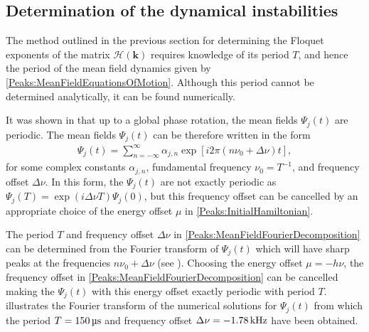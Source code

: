 \subsection{Determination of the dynamical instabilities}
\label{Peaks:ExperimentEigenvalues}

The method outlined in the previous section for determining the Floquet exponents of the matrix $\mathcal{H}(\bm{k})$ requires knowledge of its period $T$, and hence the period of the mean field dynamics given by \eqref{Peaks:MeanFieldEquationsOfMotion}. Although this period cannot be determined analytically, it can be found numerically.

It was shown in  that up to a global phase rotation, the mean fields $\Psi_j(t)$ are periodic. The mean fields $\Psi_j(t)$ can be therefore written in the form
\begin{align}
    \label{Peaks:MeanFieldFourierDecomposition}
    \Psi_j(t) = \sum_{n=-\infty}^\infty \alpha_{j,n} \exp\left[i 2\pi \left( n \nu_0 + \Delta\nu\right)t \right],
\end{align}
for some complex constants $\alpha_{j, n}$, fundamental frequency $\nu_0 = T^{-1}$, and frequency offset $\Delta \nu$. In this form, the $\Psi_j(t)$ are not exactly periodic as $\Psi_j(T) = \exp(i\Delta \nu T)\Psi_j(0)$, but this frequency offset can be cancelled by an appropriate choice of the energy offset $\mu$ in \eqref{Peaks:InitialHamiltonian}.

The period $T$ and frequency offset $\Delta\nu$ in \eqref{Peaks:MeanFieldFourierDecomposition} can be determined from the Fourier transform of $\Psi_j(t)$ which will have sharp peaks at the frequencies $n \nu_0 + \Delta \nu$ (see ). Choosing the energy offset $\mu=-h \nu$, the frequency offset in \eqref{Peaks:MeanFieldFourierDecomposition} can be cancelled making the $\Psi_j(t)$ with this energy offset exactly periodic with period $T$.  illustrates the Fourier transform of the numerical solutions for $\Psi_j(t)$ from which the period $T=\unit[150]{\micro{}s}$ and frequency offset $\Delta \nu = \unit[-1.78]{kHz}$ have been obtained.

